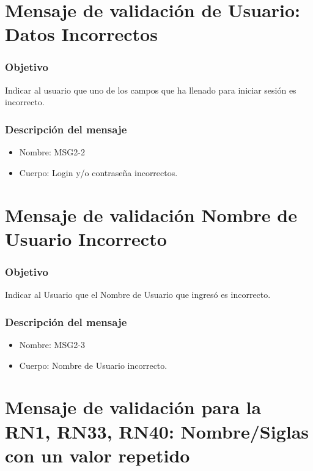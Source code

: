 \section{Mensaje de validación de Usuario: Datos Incorrectos}\label{MSG2-2}

\subsubsection{Objetivo}
Indicar al usuario que uno de los campos que ha llenado para iniciar sesión es incorrecto.

\subsubsection{Descripción del mensaje}
\begin{itemize}
\item Nombre: MSG2-2
\item Cuerpo: Login y/o contraseña incorrectos.

\end{itemize}

\section{Mensaje de validación Nombre de Usuario Incorrecto}\label{MSG2-3}

\subsubsection{Objetivo}
Indicar al Usuario que el Nombre de Usuario que ingresó es incorrecto.

\subsubsection{Descripción del mensaje}
\begin{itemize}
\item Nombre: MSG2-3
\item Cuerpo: Nombre de Usuario incorrecto.

\end{itemize}

\section{Mensaje de validación para la RN1, RN33, RN40: Nombre/Siglas con un valor repetido}\label{MSG3}

